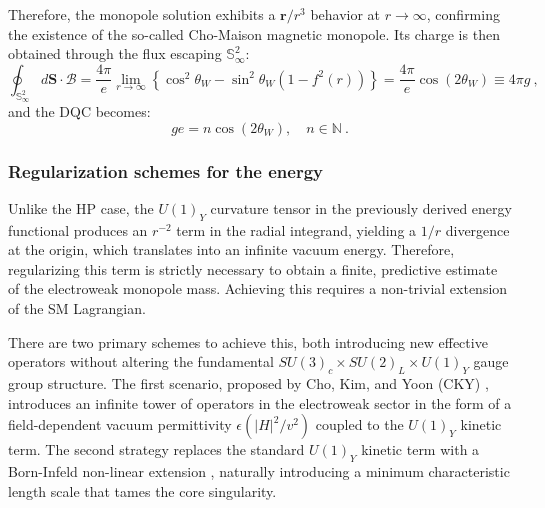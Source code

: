 \documentclass[a4paper,11pt]{article}
\begin{document}
Therefore, the monopole solution exhibits a $\boldsymbol{r}/r^3$ behavior at $r \to \infty$, confirming the existence of the so-called Cho-Maison magnetic monopole. Its charge is then obtained through the flux escaping $\mathbb S^2_\infty$:
\begin{equation}
    \oint_{\mathbb S^2_\infty} d\boldsymbol{S}\cdot\boldsymbol{\mathcal{B}} = \frac{4\pi}{e} \lim_{r\to\infty} \left\{ \cos^2\theta_W - \sin^2\theta_W (1-f^2(r)) \right\} = \frac{4\pi}{e} \cos(2\theta_W)\equiv 4\pi g\ ,
\end{equation}
and the DQC becomes:
\begin{equation}
    g e = n \cos(2\theta_W), \quad n \in \mathbb{N}\ .
\end{equation}
\subsubsection{Regularization schemes for the energy}
Unlike the HP case, the $U(1)_Y$ curvature tensor in the previously derived energy functional produces an $r^{-2}$ term in the radial integrand, yielding a $1/r$ divergence at the origin, which translates into an infinite vacuum energy. Therefore, regularizing this term is strictly necessary to obtain a finite, predictive estimate of the electroweak monopole mass. Achieving this requires a non-trivial extension of the SM Lagrangian.

There are two primary schemes to achieve this, both introducing new effective operators without altering the fundamental $SU(3)_c \times SU(2)_L \times U(1)_Y$ gauge group structure. The first scenario, proposed by Cho, Kim, and Yoon (CKY) \cite{ChoKimYoon2015}, introduces an infinite tower of operators in the electroweak sector in the form of a field-dependent vacuum permittivity $\epsilon(|H|^2/v^2)$ coupled to the $U(1)_Y$ kinetic term. The second strategy replaces the standard $U(1)_Y$ kinetic term with a Born-Infeld non-linear extension \cite{Ellis_2016}, naturally introducing a minimum characteristic length scale that tames the core singularity.
\end{document}
